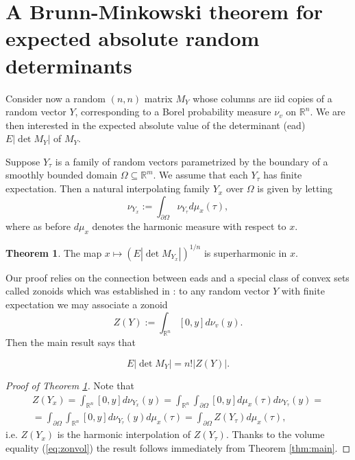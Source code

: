 \documentclass[reqno]{amsart}
\theoremstyle{definition}
\newtheorem{theorem}{Theorem}[section]
\theoremstyle{definition}
\theoremstyle{definition}
\begin{document}
\section{A Brunn-Minkowski theorem for expected absolute random determinants}

Consider now a random $(n,n)$ matrix $M_Y$ whose columns are iid copies of a random vector $Y$, corresponding to a Borel probability measure $\nu_v$ on $\mathbb{R}^n$. We are then interested in the expected absolute value of the determinant (ead) $E|\det M_Y|$ of $M_Y$. 


Suppose $Y_{\tau}$ is a family of random vectors parametrized by the boundary of a smoothly bounded domain $\Omega\subseteq \mathbb{R}^m$.  We assume that each $Y_{\tau}$ has finite expectation.  Then a natural interpolating family $Y_x$ over $\Omega$ is given by letting $$\nu_{Y_x}:=\int_{\partial \Omega}\nu_{Y_{\tau}}d\mu_x(\tau),$$ where as before $d\mu_x$ denotes the harmonic measure with respect to $x$.

\begin{theorem} \label{thm:random}
The map $x\mapsto (E|\det M_{Y_x}|)^{1/n}$ is superharmonic in $x$.   
\end{theorem}

Our proof relies on the connection between eads and a special class of convex sets called zonoids which was established in \cite[Thm 3.1]{Vitale91}: to any random vector $Y$ with finite expectation we may associate a zonoid  $$Z(Y):=\int_{\mathbb{R}^n}[0,y]d\nu_{v}(y).$$  Then the main result \cite[Thm.\ 3.2]{Vitale91} says that 

\begin{equation} \label{eq:zonvol}
 E|\det M_Y|=n!|Z(Y)|.   
\end{equation} 


\begin{proof}[Proof of Theorem \ref{thm:random}]
Note that 
\begin{eqnarray*}
  Z(Y_x)=\int_{\mathbb{R}^n}[0,y]d\nu_{Y_x}(y)=\int_{\mathbb{R}^n}\int_{\partial{\Omega}}[0,y]d\mu_x(\tau)d\nu_{Y_{\tau}}(y)=\\=\int_{\partial{\Omega}}\int_{\mathbb{R}^n}[0,y]d\nu_{Y_{\tau}}(y)d\mu_x(\tau)=\int_{\partial{\Omega}}Z(Y_{\tau})d\mu_x(\tau),
\end{eqnarray*}
 i.e. $Z(Y_x)$ is the harmonic interpolation of $Z(Y_{\tau})$. Thanks to the volume equality (\ref{eq:zonvol}) the result  follows immediately from Theorem \ref{thm:main}. 
\end{proof}



\printbibliography
\end{document}
